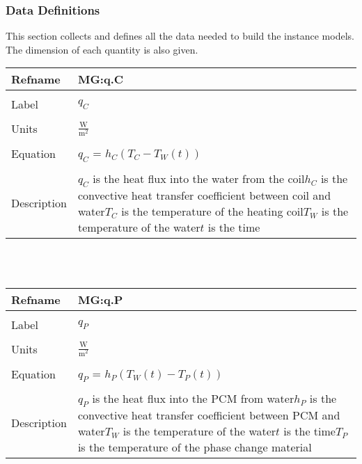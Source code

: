 \documentclass[12pt]{article}
\begin{document}
\subsubsection{Data Definitions}
\label{Sec:DDs}
This section collects and defines all the data needed to build the instance models. The dimension of each quantity is also given.
~\newline
\noindent \begin{minipage}{\textwidth}
\begin{tabular}{p{} p{}}
\toprule \textbf{Refname} & \textbf{MG:q.C}
\label{MG:q.C}
\\ \midrule \\
Label & $q_{C}$
\\ \midrule \\
Units & $\frac{\text{W}}{\text{m}^{2}}$
\\ \midrule \\
Equation & $q_{C}$ = $h_{C}(T_{C}-T_{W}(t))$
\\ \midrule \\
Description & $q_{C}$ is the heat flux into the water from the coil\newline$h_{C}$ is the convective heat transfer coefficient between coil and water\newline$T_{C}$ is the temperature of the heating coil\newline$T_{W}$ is the temperature of the water\newline$t$ is the time
\\ \bottomrule \end{tabular}
\end{minipage}\\
~\newline
\noindent \begin{minipage}{\textwidth}
\begin{tabular}{p{} p{}}
\toprule \textbf{Refname} & \textbf{MG:q.P}
\label{MG:q.P}
\\ \midrule \\
Label & $q_{P}$
\\ \midrule \\
Units & $\frac{\text{W}}{\text{m}^{2}}$
\\ \midrule \\
Equation & $q_{P}$ = $h_{P}(T_{W}(t)-T_{P}(t))$
\\ \midrule \\
Description & $q_{P}$ is the heat flux into the PCM from water\newline$h_{P}$ is the convective heat transfer coefficient between PCM and water\newline$T_{W}$ is the temperature of the water\newline$t$ is the time\newline$T_{P}$ is the temperature of the phase change material
\\ \bottomrule \end{tabular}
\end{minipage}\\
\end{document}
